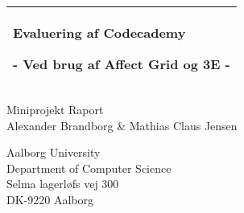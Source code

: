 %
%
%
%
%
\begin{titlepage}
  \addtolength{\hoffset}{0.5\evensidemargin-0.5\oddsidemargin} %
  \noindent%
  \begin{tabular}{@{}p{\textwidth}@{}}
    \toprule[2pt]
    \midrule
    \vspace{0.2cm}
    \begin{center}
    \Huge{\textbf{
      Evaluering af Codecademy%
    }}
    \end{center}
    \begin{center}
      \Large{
        - Ved brug af Affect Grid og 3E -%
      }
    \end{center}
    \vspace{0.2cm}\\
    \midrule
    \toprule[2pt]
  \end{tabular}
  \vspace{4 cm}
  \begin{center}
    {\large
      Miniprojekt Raport%
    }\\
    \vspace{0.2cm}
    {\Large
      Alexander Brandborg \& Mathias Claus Jensen   %
    }
  \end{center}
  \vfill
  \begin{center}
  Aalborg University\\
  Department of Computer Science\\
  Selma lagerløfs vej 300\\
  DK-9220 Aalborg
  \end{center}
\end{titlepage}

